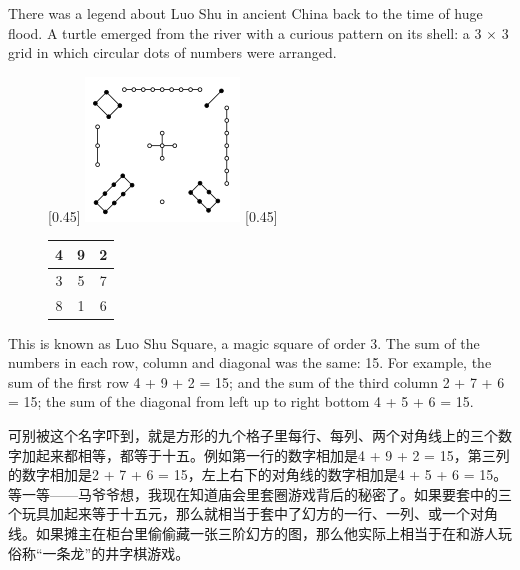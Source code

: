 \documentclass[UTF8]{article}
\begin{document}
There was a legend about Luo Shu in ancient China back to the time of huge flood. A turtle emerged from the river with a curious pattern on its shell: a 3 $\times$ 3 grid in which circular dots of numbers were arranged.

\begin{figure}[htbp]
 \centering
 [0.45\linewidth]{ \includegraphics[scale=0.6]{img/luo-shu.png}}
 [0.45\linewidth]{
   \begin{tabular}{|c|c|c|}
   \hline
   4 & 9 & 2 \\
   \hline
   3 & 5 & 7 \\
   \hline
   8 & 1 & 6 \\
   \hline
   \end{tabular}
   \vspace{8mm}
 }
 \captionsetup{labelformat=empty}
 \caption{}
 \label{fig:luo-shu}
\end{figure}

This is known as Luo Shu Square, a magic square of order 3. The sum of the numbers in each row, column and diagonal was the same: 15. For example, the sum of the first row 4 + 9 + 2 = 15; and the sum of the third column 2 + 7 + 6 = 15; the sum of the diagonal from left up to right bottom 4 + 5 + 6 = 15.

可别被这个名字吓到，就是方形的九个格子里每行、每列、两个对角线上的三个数字加起来都相等，都等于十五。例如第一行的数字相加是4 + 9 + 2 = 15，第三列的数字相加是2 + 7 + 6 = 15，左上右下的对角线的数字相加是4 + 5 + 6 = 15。等一等——马爷爷想，我现在知道庙会里套圈游戏背后的秘密了。如果要套中的三个玩具加起来等于十五元，那么就相当于套中了幻方的一行、一列、或一个对角线。如果摊主在柜台里偷偷藏一张三阶幻方的图，那么他实际上相当于在和游人玩俗称“一条龙”的井字棋游戏。
\end{document}
